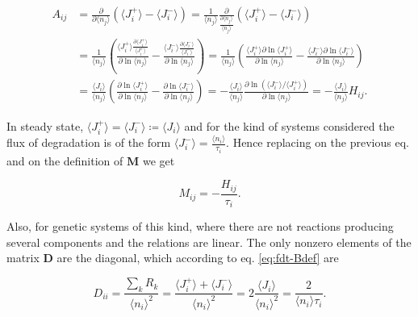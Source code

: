 \begin{equation}
  \begin{split}
    A_{ij}&=\frac{\partial}{\partial \langle n_j\rangle}\left(\langle J_i^+\rangle - \langle J_i^-\rangle\right) = \frac{1}{\langle n_j\rangle}\frac{\partial}{\frac{\partial \langle n_j\rangle}{\langle n_j\rangle}}\left(\langle J_i^+\rangle - \langle J_i^-\rangle\right)\\
    &=\frac{1}{\langle n_j\rangle}\left(\frac{\langle J_i^+\rangle\frac{\partial \langle J_i^+\rangle}{\langle J_i^+\rangle}}{\partial\ln \langle n_j\rangle} - \frac{\langle  J_i^-\rangle\frac{\partial \langle J_i^-\rangle}{\langle J_i^-\rangle}}{\partial\ln \langle n_j\rangle} \right) = \frac{1}{\langle n_j\rangle}\left(\frac{\langle J_i^+\rangle \partial\ln\langle J_i^+\rangle}{\partial\ln \langle n_j\rangle} - \frac{\langle  J_i^-\rangle\partial\ln\langle J_i^-\rangle}{\partial\ln \langle n_j\rangle} \right)\\
    &=\frac{\langle J_i\rangle}{\langle n_j\rangle}\left(\frac{\partial\ln\langle J_i^+\rangle}{\partial\ln \langle n_j\rangle} - \frac{\partial\ln\langle J_i^-\rangle}{\partial\ln \langle n_j\rangle} \right) =-\frac{\langle J_i\rangle}{\langle n_j\rangle}\frac{\partial\ln \left( \langle J_i^-\rangle/\langle J_i^+\rangle \right)}{\partial\ln \langle n_j\rangle} = -\frac{\langle J_i\rangle}{\langle n_j\rangle}H_{ij}.
  \end{split}
\end{equation}

In steady state, $\langle J_i^+\rangle = \langle J_i^-\rangle \coloneqq \langle J_i\rangle$ and for the kind of systems considered the flux of degradation is of the form $\langle J_i^-\rangle = \frac{\langle n_i\rangle}{\tau_i}$. Hence replacing on the previous eq. and on the definition of $\mathbf{M}$ we get

\begin{equation*}
  M_{ij} = -\frac{H_{ij}}{\tau_i}.
\end{equation*}

Also, for genetic systems of this kind, where there are not reactions producing several components and the relations are linear. The only nonzero elements of the matrix $\mathbf{D}$ are the diagonal, which according to eq. \eqref{eq:fdt-Bdef} are

\begin{equation*}
 D_{ii} = \frac{\sum_k R_k}{\langle n_i\rangle^2} =  \frac{\langle J_i^+\rangle + \langle J_i^-\rangle}{\langle n_i\rangle^2} = 2\frac{\langle J_i\rangle}{\langle n_i\rangle^2} = \frac{2}{\langle n_i\rangle\tau_i}.
\end{equation*}

